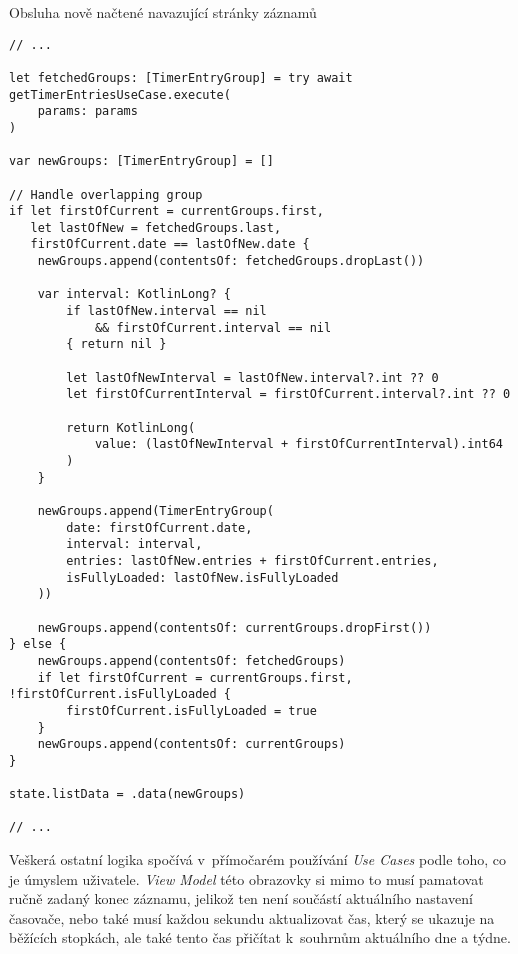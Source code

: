 \begin{listing}
\caption{Obsluha nově načtené navazující stránky záznamů}\label{code:view-mode-entry-group-overlap}
\begin{verbatim}
// ...

let fetchedGroups: [TimerEntryGroup] = try await getTimerEntriesUseCase.execute(
    params: params
)

var newGroups: [TimerEntryGroup] = []

// Handle overlapping group
if let firstOfCurrent = currentGroups.first,
   let lastOfNew = fetchedGroups.last,
   firstOfCurrent.date == lastOfNew.date {
    newGroups.append(contentsOf: fetchedGroups.dropLast())
    
    var interval: KotlinLong? {
        if lastOfNew.interval == nil 
            && firstOfCurrent.interval == nil 
        { return nil }
        
        let lastOfNewInterval = lastOfNew.interval?.int ?? 0
        let firstOfCurrentInterval = firstOfCurrent.interval?.int ?? 0
        
        return KotlinLong(
            value: (lastOfNewInterval + firstOfCurrentInterval).int64
        )
    }
    
    newGroups.append(TimerEntryGroup(
        date: firstOfCurrent.date,
        interval: interval,
        entries: lastOfNew.entries + firstOfCurrent.entries,
        isFullyLoaded: lastOfNew.isFullyLoaded
    ))
    
    newGroups.append(contentsOf: currentGroups.dropFirst())
} else {
    newGroups.append(contentsOf: fetchedGroups)
    if let firstOfCurrent = currentGroups.first, !firstOfCurrent.isFullyLoaded {
        firstOfCurrent.isFullyLoaded = true
    }
    newGroups.append(contentsOf: currentGroups)
}

state.listData = .data(newGroups)

// ...
\end{verbatim}
\end{listing}

Veškerá ostatní logika spočívá v~přímočarém používání \emph{Use Cases} podle toho, co je úmyslem uživatele. \emph{View Model} této obrazovky si mimo to musí pamatovat ručně zadaný konec záznamu, jelikož ten není součástí aktuálního nastavení časovače, nebo také musí každou sekundu aktualizovat čas, který se ukazuje na běžících stopkách, ale také tento čas přičítat k~souhrnům aktuálního dne a týdne.

